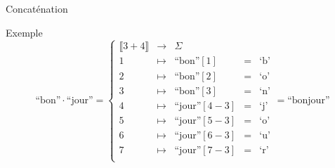 \begin{frame}{Concaténation}
  \vspace{-2mm}
  \begin{exampleblock}{Exemple}
    \vspace{-9mm}
    $$\text{``bon''} \cdot \text{``jour''} = \left\{\begin{array}{cclcc}
    \llbracket 3 + 4 \rrbracket & \rightarrow & \Sigma\\
    1 & \mapsto & \text{``bon''}[1] & = &\text{`b'}\\
    2 & \mapsto & \text{``bon''}[2] & = &\text{`o'}\\
    3 & \mapsto & \text{``bon''}[3] & = &\text{`n'}\\
    4 & \mapsto & \text{``jour''}[4-3]& = &\text{`j'}\\
    5 & \mapsto & \text{``jour''}[5-3]& = &\text{`o'}\\
    6 & \mapsto & \text{``jour''}[6-3] & = &\text{`u'}\\
    7 & \mapsto & \text{``jour''}[7-3] & = &\text{`r'}\\
    \end{array}\right. = \text{``bonjour''}$$
  \end{exampleblock}
\end{frame}

\endgroup
